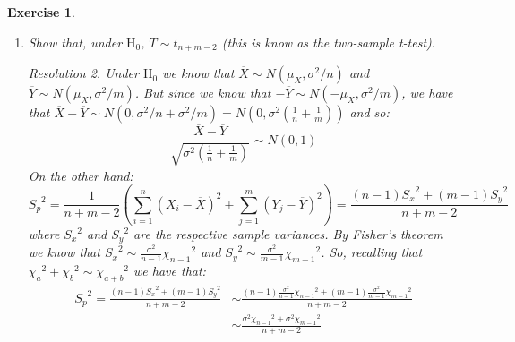 \documentclass[10pt,a4paper]{article}
\theoremstyle{plain}
\newtheorem{exercice}{Exercise}
\theoremstyle{remark}
\newtheorem*{resolution}{Resolution}
\newcommand{\const}{\text{const.}}
\begin{document}
\begin{exercice}
\begin{enumerate}
\begin{resolution}
\begin{align*}
            \end{align*}
            We will reject $\text{H}_0$ when $\lambda<\const$ So:
            \begin{align*}
              \lambda<\const & \iff \left(1+\frac{{(\overline{X}-\overline{Y})}^2}{(\frac{1}{n}+\frac{1}{m})(n+m-2){S_p}^2}\right)^{-\frac{n+m}{2}}<\const \\
                             & \iff 1+\frac{{(\overline{X}-\overline{Y})}^2}{(\frac{1}{n}+\frac{1}{m})(n+m-2){S_p}^2}>\const                               \\
                             & \iff \frac{{(\overline{X}-\overline{Y})}^2}{(\frac{1}{n}+\frac{1}{m}){S_p}^2}>\const                                        \\
                             & \iff T^2>\const                                                                                                             \\
                             & \iff \abs{T}>\const
            \end{align*}
            because it goes without saying that $n+m-2>0$.
          \end{resolution}
    \item Show that, under $\text{H}_0$, $T\sim t_{n+m-2}$ (this is know as the two-sample t-test).
          \begin{resolution}
            Under $\text{H}_0$ we know that $\overline{X}\sim N(\mu_X,\sigma^2/n)$ and $\overline{Y}\sim N(\mu_X,\sigma^2/m)$. But since we know that $-\overline{Y}\sim N(-\mu_X,\sigma^2/m)$, we have that $\overline{X}-\overline{Y}\sim N(0,\sigma^2/n+\sigma^2/m)=N(0,\sigma^2(\frac{1}{n}+\frac{1}{m}))$ and so: $$\frac{\overline{X}-\overline{Y}}{\sqrt{\sigma^2\left(\frac{1}{n}+\frac{1}{m}\right)}}\sim N(0,1)$$
            On the other hand:
            $${S_p}^2=\frac{1}{n+m-2}\left(\sum_{i=1}^n{(X_i-\overline{X})}^2+\sum_{j=1}^m{(Y_j-\overline{Y})}^2\right)=\frac{(n-1){S_x}^2+(m-1){S_y}^2}{n+m-2}$$ where ${S_x}^2$ and ${S_y}^2$ are the respective sample variances. By Fisher's theorem we know that ${S_x}^2\sim\frac{\sigma^2}{n-1}{\chi_{n-1}}^2$ and ${S_y}^2\sim\frac{\sigma^2}{m-1}{\chi_{m-1}}^2$. So, recalling that ${\chi_a}^2+{\chi_b}^2\sim{\chi_{a+b}}^2$ we have that:
            \begin{align*}
              {S_p}^2=\frac{(n-1){S_x}^2+(m-1){S_y}^2}{n+m-2} & \sim\frac{(n-1)\frac{\sigma^2}{n-1}{\chi_{n-1}}^2+(m-1)\frac{\sigma^2}{m-1}{\chi_{m-1}}^2}{n+m-2} \\
                                                              & \sim\frac{\sigma^2{\chi_{n-1}}^2+\sigma^2{\chi_{m-1}}^2}{n+m-2}                                   \\

\end{align*}
\end{resolution}
\end{enumerate}
\end{exercice}
\end{document}
